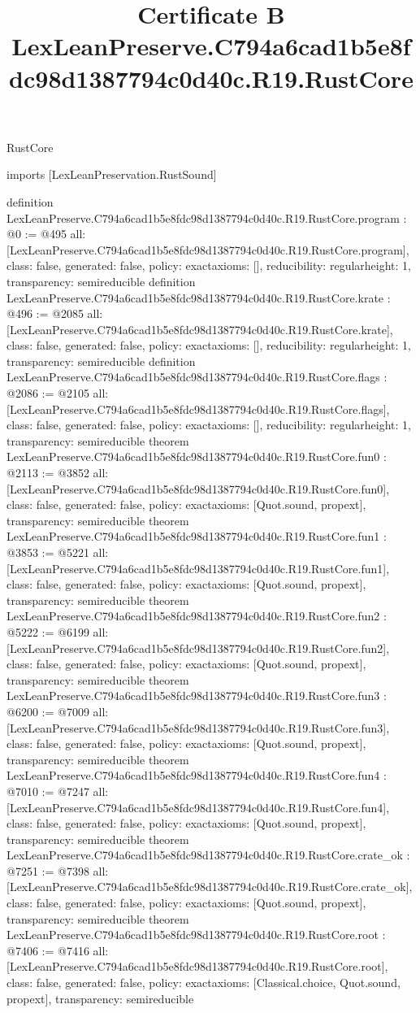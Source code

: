 \begin{lexlean}{RustCore}
\title{Certificate B LexLeanPreserve.C794a6cad1b5e8fdc98d1387794c0d40c.R19.RustCore}
\begin{coremodule}
imports [LexLeanPreservation.RustSound]

definition LexLeanPreserve.C794a6cad1b5e8fdc98d1387794c0d40c.R19.RustCore.program : @0 := @495 {
  all: [LexLeanPreserve.C794a6cad1b5e8fdc98d1387794c0d40c.R19.RustCore.program],
  class: false,
  generated: false,
  policy: exact{axioms: []},
  reducibility: regular{height: 1},
  transparency: semireducible
}
definition LexLeanPreserve.C794a6cad1b5e8fdc98d1387794c0d40c.R19.RustCore.krate : @496 := @2085 {
  all: [LexLeanPreserve.C794a6cad1b5e8fdc98d1387794c0d40c.R19.RustCore.krate],
  class: false,
  generated: false,
  policy: exact{axioms: []},
  reducibility: regular{height: 1},
  transparency: semireducible
}
definition LexLeanPreserve.C794a6cad1b5e8fdc98d1387794c0d40c.R19.RustCore.flags : @2086 := @2105 {
  all: [LexLeanPreserve.C794a6cad1b5e8fdc98d1387794c0d40c.R19.RustCore.flags],
  class: false,
  generated: false,
  policy: exact{axioms: []},
  reducibility: regular{height: 1},
  transparency: semireducible
}
theorem LexLeanPreserve.C794a6cad1b5e8fdc98d1387794c0d40c.R19.RustCore.fun0 : @2113 := @3852 {
  all: [LexLeanPreserve.C794a6cad1b5e8fdc98d1387794c0d40c.R19.RustCore.fun0],
  class: false,
  generated: false,
  policy: exact{axioms: [Quot.sound, propext]},
  transparency: semireducible
}
theorem LexLeanPreserve.C794a6cad1b5e8fdc98d1387794c0d40c.R19.RustCore.fun1 : @3853 := @5221 {
  all: [LexLeanPreserve.C794a6cad1b5e8fdc98d1387794c0d40c.R19.RustCore.fun1],
  class: false,
  generated: false,
  policy: exact{axioms: [Quot.sound, propext]},
  transparency: semireducible
}
theorem LexLeanPreserve.C794a6cad1b5e8fdc98d1387794c0d40c.R19.RustCore.fun2 : @5222 := @6199 {
  all: [LexLeanPreserve.C794a6cad1b5e8fdc98d1387794c0d40c.R19.RustCore.fun2],
  class: false,
  generated: false,
  policy: exact{axioms: [Quot.sound, propext]},
  transparency: semireducible
}
theorem LexLeanPreserve.C794a6cad1b5e8fdc98d1387794c0d40c.R19.RustCore.fun3 : @6200 := @7009 {
  all: [LexLeanPreserve.C794a6cad1b5e8fdc98d1387794c0d40c.R19.RustCore.fun3],
  class: false,
  generated: false,
  policy: exact{axioms: [Quot.sound, propext]},
  transparency: semireducible
}
theorem LexLeanPreserve.C794a6cad1b5e8fdc98d1387794c0d40c.R19.RustCore.fun4 : @7010 := @7247 {
  all: [LexLeanPreserve.C794a6cad1b5e8fdc98d1387794c0d40c.R19.RustCore.fun4],
  class: false,
  generated: false,
  policy: exact{axioms: [Quot.sound, propext]},
  transparency: semireducible
}
theorem LexLeanPreserve.C794a6cad1b5e8fdc98d1387794c0d40c.R19.RustCore.crate_ok : @7251 := @7398 {
  all: [LexLeanPreserve.C794a6cad1b5e8fdc98d1387794c0d40c.R19.RustCore.crate_ok],
  class: false,
  generated: false,
  policy: exact{axioms: [Quot.sound, propext]},
  transparency: semireducible
}
theorem LexLeanPreserve.C794a6cad1b5e8fdc98d1387794c0d40c.R19.RustCore.root : @7406 := @7416 {
  all: [LexLeanPreserve.C794a6cad1b5e8fdc98d1387794c0d40c.R19.RustCore.root],
  class: false,
  generated: false,
  policy: exact{axioms: [Classical.choice, Quot.sound, propext]},
  transparency: semireducible
}


\end{coremodule}
\end{lexlean}
